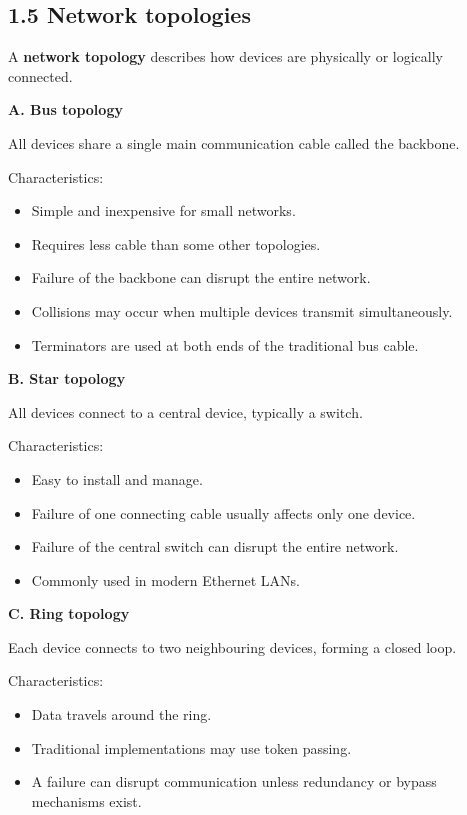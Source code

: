 \subsection{1.5 Network topologies}

A \textbf{network topology} describes how devices are physically or logically connected.

\textbf{A. Bus topology}

All devices share a single main communication cable called the backbone.

Characteristics:

\begin{itemize}
    \item Simple and inexpensive for small networks.
    \item Requires less cable than some other topologies.
    \item Failure of the backbone can disrupt the entire network.
    \item Collisions may occur when multiple devices transmit simultaneously.
    \item Terminators are used at both ends of the traditional bus cable.
\end{itemize}

\textbf{B. Star topology}

All devices connect to a central device, typically a switch.

Characteristics:

\begin{itemize}
    \item Easy to install and manage.
    \item Failure of one connecting cable usually affects only one device.
    \item Failure of the central switch can disrupt the entire network.
    \item Commonly used in modern Ethernet LANs.
\end{itemize}

\textbf{C. Ring topology}

Each device connects to two neighbouring devices, forming a closed loop.

Characteristics:

\begin{itemize}
    \item Data travels around the ring.
    \item Traditional implementations may use token passing.
    \item A failure can disrupt communication unless redundancy or bypass mechanisms exist.
\end{itemize}

